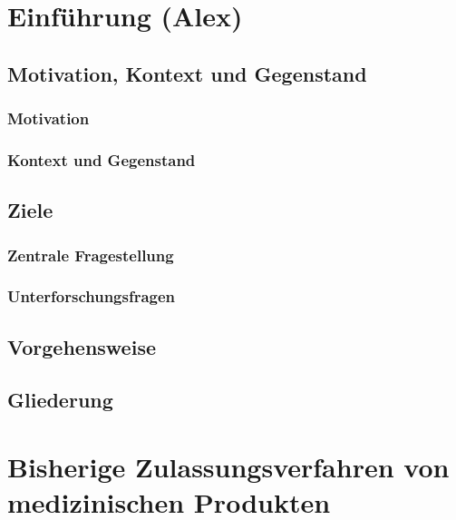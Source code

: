 \documentclass[a4paper, 11pt]{article}
\begin{document}
    \pagestyle{empty}
    
    \newpage
    \hypertarget{contents}{}
    \tableofcontents

    \newpage
    \pagestyle{fancy}
    \section{Einführung \small{(Alex)}}\label{sec:introduction}
        
		\subsection{Motivation, Kontext und Gegenstand}\label{sec:motivationcontext}
			
			\subsubsection{Motivation}\label{sec:motivation}
				
			\subsubsection{Kontext und Gegenstand}\label{sec:context}
				
		\subsection{Ziele}\label{sec:goals}
			
			\subsubsection{Zentrale Fragestellung}\label{sec:questions}
				
			\subsubsection{Unterforschungsfragen}\label{sec:hypotheses}
				

		\subsection{Vorgehensweise}\label{sec:procedure}
			
			\subsection{Gliederung}\label{sec:structure}
				

	\newpage
	\section{Bisherige Zulassungsverfahren von medizinischen Produkten}\label{sec:admission}
		
\end{document}
